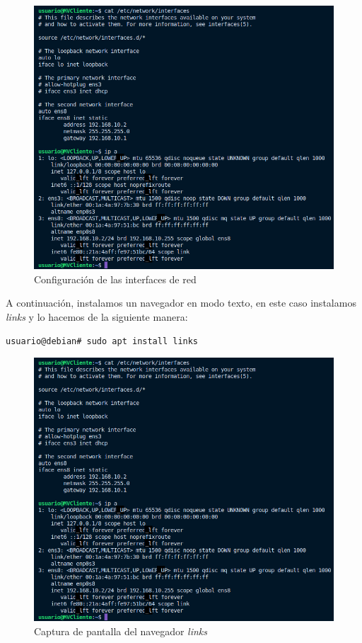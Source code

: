 \documentclass{report}
\begin{document}
  \begin{figure}[H]
    \centering
    \includegraphics[scale=0.65]{img/configuracion_interfaces_cliente.png}
    \caption{Configuración de las interfaces de red}
    \label{fig:configuracion_interfaces_cliente}
  \end{figure}

  A continuación, instalamos un navegador en modo texto, en este caso instalamos \emph{links} y lo hacemos de la siguiente manera:

  \begin{verbatim}
usuario@debian# sudo apt install links
  \end{verbatim}

  \begin{figure}[H]
    \centering
    \includegraphics[scale=0.65]{img/configuracion_interfaces_cliente.png}
    \caption{Captura de pantalla del navegador \emph{links}}
    \label{fig:links}
  \end{figure}
\end{document}
